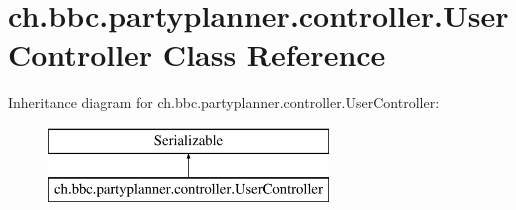\hypertarget{classch_1_1bbc_1_1partyplanner_1_1controller_1_1_user_controller}{}\section{ch.\+bbc.\+partyplanner.\+controller.\+User\+Controller Class Reference}
\label{classch_1_1bbc_1_1partyplanner_1_1controller_1_1_user_controller}
Inheritance diagram for ch.\+bbc.\+partyplanner.\+controller.\+User\+Controller\+:\begin{figure}[H]
\begin{center}
\leavevmode
\includegraphics[height=2.000000cm]{classch_1_1bbc_1_1partyplanner_1_1controller_1_1_user_controller}
\end{center}
\end{figure}
